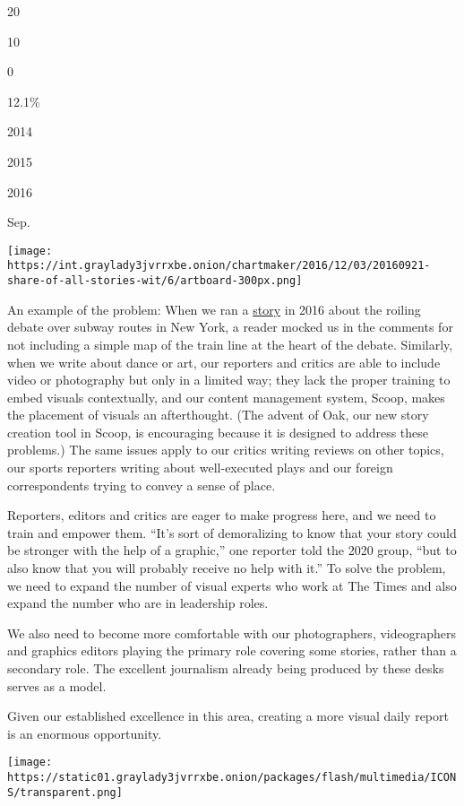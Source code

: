 20

10

0

12.1\%

2014

2015

2016

Sep.

\texttt{[image: https://int.graylady3jvrrxbe.onion/chartmaker/2016/12/03/20160921-share-of-all-stories-wit/6/artboard-300px.png]}

An example of the problem: When we ran a
\href{https://www.nytimes3xbfgragh.onion/2016/05/23/nyregion/f-train-express-plan-brings-anger-and-joy-depending-on-the-neighborhood.html}{story}
in 2016 about the roiling debate over subway routes in New York, a
reader mocked us in the comments for not including a simple map of the
train line at the heart of the debate. Similarly, when we write about
dance or art, our reporters and critics are able to include video or
photography but only in a limited way; they lack the proper training to
embed visuals contextually, and our content management system, Scoop,
makes the placement of visuals an afterthought. (The advent of Oak, our
new story creation tool in Scoop, is encouraging because it is designed
to address these problems.) The same issues apply to our critics writing
reviews on other topics, our sports reporters writing about
well-executed plays and our foreign correspondents trying to convey a
sense of place.

Reporters, editors and critics are eager to make progress here, and we
need to train and empower them. ``It's sort of demoralizing to know that
your story could be stronger with the help of a graphic,'' one reporter
told the 2020 group, ``but to also know that you will probably receive
no help with it.'' To solve the problem, we need to expand the number of
visual experts who work at The Times and also expand the number who are
in leadership roles.

We also need to become more comfortable with our photographers,
videographers and graphics editors playing the primary role covering
some stories, rather than a secondary role. The excellent journalism
already being produced by these desks serves as a model.

Given our established excellence in this area, creating a more visual
daily report is an enormous opportunity.

\texttt{[image: https://static01.graylady3jvrrxbe.onion/packages/flash/multimedia/ICONS/transparent.png]}

